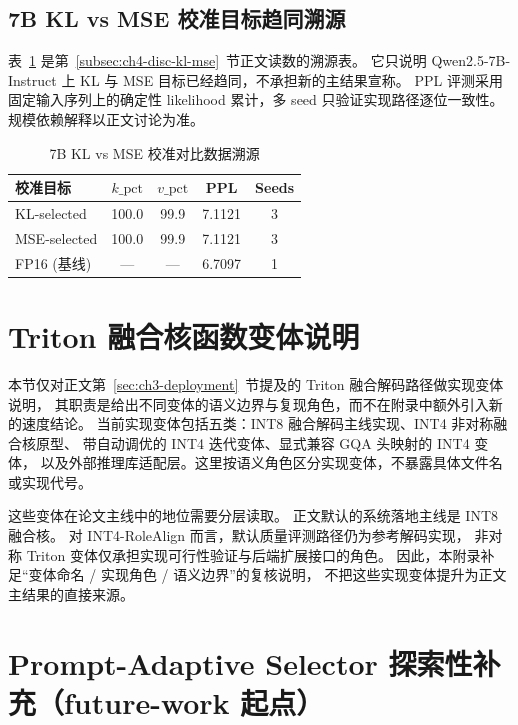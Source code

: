 \subsection{7B KL vs MSE 校准目标趋同溯源}
\label{subsec:app-7b-kl-mse}
表~\ref{tab:app-7b-kl-mse} 是第~\ref{subsec:ch4-disc-kl-mse}~节正文读数的溯源表。
它只说明 Qwen2.5-7B-Instruct 上 KL 与 MSE 目标已经趋同，不承担新的主结果宣称。
PPL 评测采用固定输入序列上的确定性 likelihood 累计，多 seed 只验证实现路径逐位一致性。规模依赖解释以正文讨论为准。

\begin{table}[!htbp]
  \centering
  \caption{7B KL vs MSE 校准对比数据溯源}
  \label{tab:app-7b-kl-mse}
  \small
  \begin{tabular}{lcccc}
    \toprule
    \textbf{校准目标} & $k\_\text{pct}$ & $v\_\text{pct}$ & \textbf{PPL} & \textbf{Seeds} \\
    \midrule
    KL-selected  & 100.0 & 99.9 & 7.1121 & 3 \\
    MSE-selected & 100.0 & 99.9 & 7.1121 & 3 \\
    FP16 (基线)   & ---   & ---  & 6.7097 & 1 \\
    \bottomrule
  \end{tabular}
\end{table}


\section{Triton 融合核函数变体说明}
\label{sec:app-triton-variants}

本节仅对正文第~\ref{sec:ch3-deployment}~节提及的 Triton 融合解码路径做实现变体说明，
其职责是给出不同变体的语义边界与复现角色，而不在附录中额外引入新的速度结论。
当前实现变体包括五类：INT8 融合解码主线实现、INT4 非对称融合核原型、
带自动调优的 INT4 迭代变体、显式兼容 GQA 头映射的 INT4 变体，
以及外部推理库适配层。这里按语义角色区分实现变体，不暴露具体文件名或实现代号。

这些变体在论文主线中的地位需要分层读取。
正文默认的系统落地主线是 INT8 融合核。
对 INT4-RoleAlign 而言，默认质量评测路径仍为参考解码实现，
非对称 Triton 变体仅承担实现可行性验证与后端扩展接口的角色。
因此，本附录补足“变体命名 / 实现角色 / 语义边界”的复核说明，
不把这些实现变体提升为正文主结果的直接来源。


\section{Prompt-Adaptive Selector 探索性补充（future-work 起点）}
\label{sec:app-prompt-adaptive}

